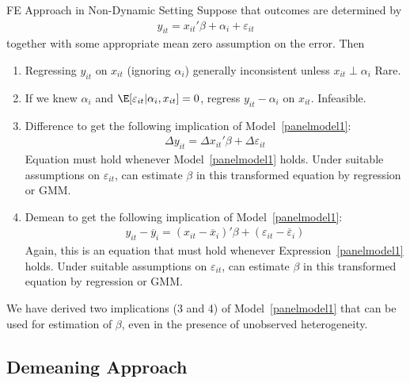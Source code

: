 \documentclass[aspectratio=169, handout]{beamer}
\begin{document}
{\scriptsize
\begin{frame}{FE Approach in Non-Dynamic Setting}
Suppose that outcomes are determined by
\begin{align}
  y_{it}
  =
  x_{it}'\beta
  + \alpha_i
  + \varepsilon_{it}
  \label{panelmodel1}
\end{align}
together with some appropriate mean zero assumption on the error.
Then
\begin{enumerate}
  \item Regressing $y_{it}$ on $x_{it}$ (\alert{ignoring $\alpha_i$})
    generally inconsistent unless $x_{it}\perp \alpha_i$
    Rare.

  \pause
  \item If we \alert{knew $\alpha_i$}
    and $\E[\varepsilon_{it}|\alpha_i,x_{it}]=0$,
    regress $y_{it}-\alpha_i$ on
    $x_{it}$.
    Infeasible.

  \pause

  \item \alert{Difference} to get
    the following implication of Model~\ref{panelmodel1}:
    \begin{align*}
      \Delta y_{it} = \Delta x_{it}'\beta + \Delta \varepsilon_{it}
    \end{align*}
    Equation must hold whenever Model~\ref{panelmodel1} holds.
    Under suitable assumptions on $\varepsilon_{it}$, can estimate
    $\beta$ in this transformed equation by regression or GMM.

  \pause

  \item \alert{Demean} to get
    the following implication of Model~\ref{panelmodel1}:
    \begin{align*}
      y_{it} - \overline{y}_i
      =
      (x_{it}-\overline{x}_i)'\beta
      + (\varepsilon_{it}-\overline{\varepsilon}_i)
    \end{align*}
    Again, this is an equation that must hold whenever
    Expression~\ref{panelmodel1} holds.
    Under suitable assumptions on $\varepsilon_{it}$, can estimate
    $\beta$ in this transformed equation by regression or GMM.
\end{enumerate}
\pause
We have derived two implications (3 and 4) of Model~\ref{panelmodel1}
that can be used for estimation of $\beta$, even in the presence of
unobserved heterogeneity.
\end{frame}
}

\subsection{Demeaning Approach}
\end{document}
